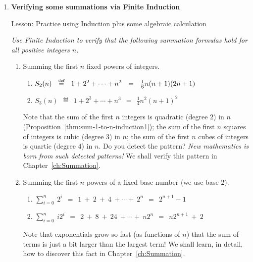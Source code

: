 \begin{enumerate}
\item
{\bf Verifying some summations via Finite Induction}

{\sc Lesson:} Practice using Induction plus some algebraic calculation

\smallskip

{\em Use Finite Induction to verify that the following summation formulas hold for all positive integers $n$.}
  \begin{enumerate}
  \item
Summing the first $n$ fixed powers of integers.
       \begin{enumerate}
       \item
$S_2(n) \ \ \stackrel{\mbox{{\tiny def}}}{=} \ \ 1 + 2^2 + \cdots  + n^2 \ \ = \ \ {1 \over 6} n (n+1)(2n+1)$

     \medskip\item
$S_3(n) \ \ \eqdef \ \
1 + 2^3 + \cdots  + n^3 \ \ = \ \
\frac{1}{4} n^2 (n+1)^2$
    \end{enumerate}
    
\smallskip
    
Note that the sum of the first $n$ integers is quadratic (degree $2$) in $n$ (Proposition~\ref{thm:sum-1-to-n-induction1}); the sum of the first $n$ squares of integers is cubic (degree $3$) in $n$; the sum of the first $n$ cubes of integers is quartic (degree $4$) in $n$.  Do you detect the pattern?  {\em New mathematics is born from such detected patterns!}  We shall verify this pattern in Chapter~\ref{ch:Summation}.

  \medskip\item
Summing the first $n$ powers of a fixed base number (we use base $2$).

\smallskip

       \begin{enumerate}
       \item
$\sum_{i=0}^n \ 2^i \ \ = \ \ 1 \ + \ 2 \ + \ 4 \ +  \cdots + \ 2^n \ \ = \ \ 2^{n+1} -1$
       \medskip\item
$\sum_{i=0}^n \ i 2^i \ \ = \ \ 2 \ + \ 8 \ + \ 24 \ +  \cdots + \ n 2^n \ \ = \ \
n 2^{n+1} \ + \ 2$
    \end{enumerate}
Note that exponentials grow so fast (as functions of $n$) that the sum of terms is just a bit larger than the largest term!  We shall learn, in detail, how to discover this fact in Chapter~\ref{ch:Summation}.

\ignore{*********
\medskip\item

}
\end{enumerate}
\end{enumerate}

